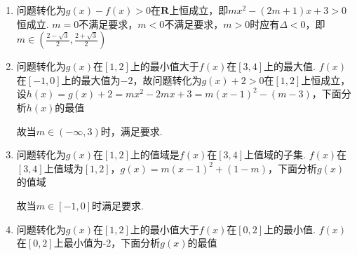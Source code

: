 \begin{enumerate}
\begin{enumerate}
        \begin{jieda}
            \begin{enumerate}
                \item 问题转化为$g(x) - f(x) > 0$在$\mathbf{R}$上恒成立，即$mx^2-(2m+1)x+3 > 0$恒成立. $m = 0$不满足要求，$m < 0$不满足要求，$m > 0$时应有$\Delta < 0$，即$m \in (\frac{2-\sqrt{3}}{2}, \frac{2+\sqrt{3}}{2})$
                \item 问题转化为$g(x)$在$[1, 2]$上的最小值大于$f(x)$在$[3, 4]$上的最大值. $f(x)$在$[-1, 0]$上的最大值为$-2$，故问题转化为$g(x) + 2 > 0$在$[1, 2]$上恒成立，设$h(x) = g(x) + 2 = mx^2-2mx + 3 = m(x-1)^2-(m-3)$，下面分析$h(x)$的最值
                故当$m \in (-\infty, 3)$时，满足要求.
                \item 问题转化为$g(x)$在$[1, 2]$上的值域是$f(x)$在$[3, 4]$上值域的子集. $f(x)$在$[3, 4]$上值域为$[1, 2]$，$g(x) = m(x-1)^2 + (1-m)$，下面分析$g(x)$的值域
                故当$m \in [-1, 0]$时满足要求.
                \item 问题转化为$g(x)$在$[1, 2]$上的最小值大于$f(x)$在$[0, 2]$上的最小值. $f(x)$在$[0, 2]$上最小值为-2，下面分析$g(x)$的最值
\end{enumerate}
\end{jieda}
\end{enumerate}
\end{enumerate}
